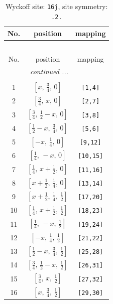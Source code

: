 \documentclass[fleqn,8pt]{jsarticle}
\begin{document}
\renewcommand{\arraystretch}{1.2}
\begin{longtable}{ccc}
\caption{Wyckoff site: {\tt 16j}, site symmetry: {\tt .2.}}
 \\
 \hline \hline
No. & position & mapping \\ \hline \endfirsthead

\multicolumn{2}{l}{\tablename\ \thetable{}} \\
 \hline \hline
No. & position & mapping \\ \hline \endhead

 \hline \hline
\multicolumn{2}{r}{\footnotesize\it continued ...} \\ \endfoot

 \hline \hline
\multicolumn{2}{r}{} \\ \endlastfoot

1 & $\left[ x,\, \frac{3}{4},\, 0 \right]$ & {\tt [1,4]} \\ \hline
2 & $\left[ \frac{3}{4},\, x,\, 0 \right]$ & {\tt [2,7]} \\ \hline
3 & $\left[ \frac{3}{4},\, \frac{1}{2} - x,\, 0 \right]$ & {\tt [3,8]} \\ \hline
4 & $\left[ \frac{1}{2} - x,\, \frac{3}{4},\, 0 \right]$ & {\tt [5,6]} \\ \hline
5 & $\left[ - x,\, \frac{1}{4},\, 0 \right]$ & {\tt [9,12]} \\ \hline
6 & $\left[ \frac{1}{4},\, - x,\, 0 \right]$ & {\tt [10,15]} \\ \hline
7 & $\left[ \frac{1}{4},\, x + \frac{1}{2},\, 0 \right]$ & {\tt [11,16]} \\ \hline
8 & $\left[ x + \frac{1}{2},\, \frac{1}{4},\, 0 \right]$ & {\tt [13,14]} \\ \hline
9 & $\left[ x + \frac{1}{2},\, \frac{1}{4},\, \frac{1}{2} \right]$ & {\tt [17,20]} \\ \hline
10 & $\left[ \frac{1}{4},\, x + \frac{1}{2},\, \frac{1}{2} \right]$ & {\tt [18,23]} \\ \hline
11 & $\left[ \frac{1}{4},\, - x,\, \frac{1}{2} \right]$ & {\tt [19,24]} \\ \hline
12 & $\left[ - x,\, \frac{1}{4},\, \frac{1}{2} \right]$ & {\tt [21,22]} \\ \hline
13 & $\left[ \frac{1}{2} - x,\, \frac{3}{4},\, \frac{1}{2} \right]$ & {\tt [25,28]} \\ \hline
14 & $\left[ \frac{3}{4},\, \frac{1}{2} - x,\, \frac{1}{2} \right]$ & {\tt [26,31]} \\ \hline
15 & $\left[ \frac{3}{4},\, x,\, \frac{1}{2} \right]$ & {\tt [27,32]} \\ \hline
16 & $\left[ x,\, \frac{3}{4},\, \frac{1}{2} \right]$ & {\tt [29,30]} \\
\end{longtable}
\end{document}

